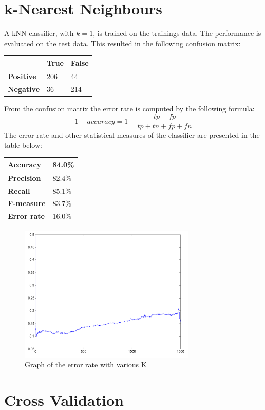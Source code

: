 \documentclass[a4paper]{article}
\begin{document}
\section{k-Nearest Neighbours}
A kNN classifier, with $k = 1$, is trained on the trainings data. The performance is evaluated on the test data. This resulted in the following confusion matrix:
\begin{center}
\begin{tabular}{ | l | l | l | }
\hline
 & \textbf{True} & \textbf{False}\\
\hline
\textbf{Positive} & 206 & 44\\
\hline
\textbf{Negative} & 36 & 214\\
\hline
\end{tabular}
\end{center}
From the confusion matrix the error rate is computed by the following formula:
\begin{equation}
1 - accuracy = 1 - \frac{tp + fp}{tp + tn + fp + fn}
\end{equation}
The error rate and other statistical measures of the classifier are presented in the table below:
\begin{center}
\begin{tabular}{ | l | l | }
\hline
\textbf{Accuracy} & 84.0\%\\
\hline
\textbf{Precision} & 82.4\%\\
\hline
\textbf{Recall} & 85.1\%\\
\hline
\textbf{F-measure} & 83.7\%\\
\hline
\textbf{Error rate} & 16.0\%\\
\hline
\end{tabular}
\end{center}

\begin{figure}[!ht]
\centering
\includegraphics[width=0.75\textwidth]{images/error_rate_1500_1.pdf}
\caption{Graph of the error rate with various K}
\label{graph}
\end{figure}


\section{Cross Validation}
\end{document}
